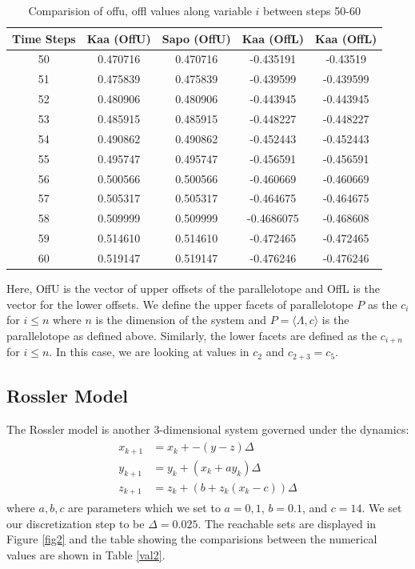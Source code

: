\documentclass[EPiC]{easychair}
\begin{document}
\begin{table}[h]
\centering
\begin{tabular}{|c|c|c|c|c|}
    \hline
    Time Steps & Kaa (OffU) & Sapo (OffU) & Kaa (OffL) & Kaa (OffL)  \\
    \hline
     50 & 0.470716 & 0.470716 & -0.435191 & -0.43519 \\
    \hline
     51 & 0.475839 & 0.475839 & -0.439599 & -0.439599 \\ 
    \hline
     52 & 0.480906 & 0.480906 & -0.443945 & -0.443945\\
    \hline
     53 & 0.485915 &  0.485915 & -0.448227 &  -0.448227 \\ 
    \hline
     54 & 0.490862 & 0.490862 & -0.452443 & -0.452443 \\ 
    \hline
     55 & 0.495747 & 0.495747 & -0.456591 & -0.456591 \\
    \hline
     56 & 0.500566 & 0.500566 & -0.460669 & -0.460669 \\ 
    \hline
     57 & 0.505317 & 0.505317 & -0.464675 & -0.464675\\ 
    \hline
     58 & 0.509999 & 0.509999  & -0.4686075 & -0.468608 \\ 
    \hline
     59 & 0.514610 & 0.514610 & -0.472465 & -0.472465\\
    \hline
     60 & 0.519147 & 0.519147 & -0.476246 & -0.476246 \\
    \hline
\end{tabular}
\caption{Comparision of offu, offl values along variable $i$ between steps 50-60}
\label{val1}
\end{table}
\noindent Here, OffU is the vector of upper offsets of the parallelotope and OffL is the vector for the lower offsets. We define the upper facets of parallelotope $P$ as the $c_i$ for $i \leq n$ where $n$ is the dimension of the system and $P = \langle \Lambda, c \rangle$ is the parallelotope as defined above. Similarly, the lower facets are defined as the $c_{i+n}$ for $i \leq n$. In this case, we are looking at values in $c_2$ and $c_{2+3} = c_5$.

\subsection{Rossler Model}
\noindent The Rossler model is another 3-dimensional system governed under the dynamics:
\begin{align} \label{rossler}
    \begin{split}
        x_{k+1} &= x_k + -(y-z)\Delta \\
        y_{k+1} &= y_k + (x_k + ay_k)\Delta \\
        z_{k+1} &= z_k + (b + z_k(x_k - c))\Delta
    \end{split}
\end{align}
where $a,b,c$ are parameters which we set to $a = 0,1$, $b =0.1$, and $c = 14$. We set our discretization step to be $\Delta= 0.025$.
The reachable sets are displayed in Figure \ref{fig2} and the table showing the comparisions between the numerical values are shown in Table \ref{val2}.
\end{document}
